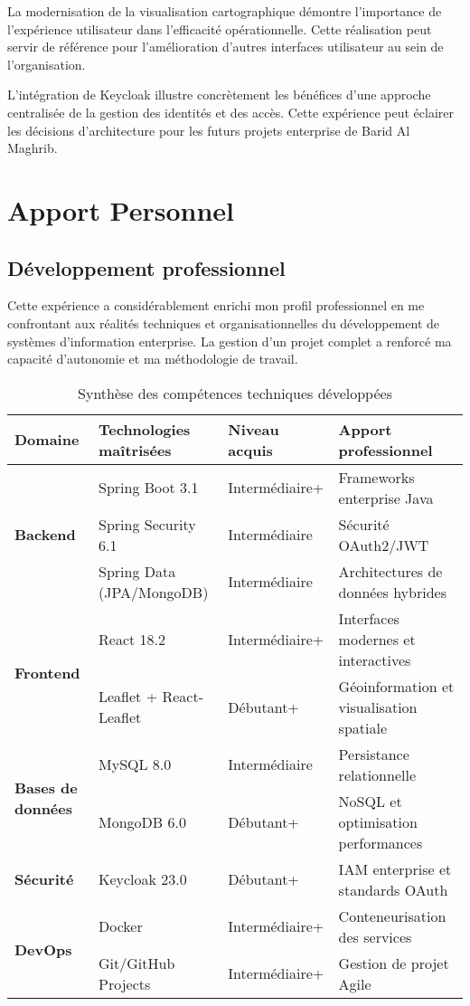 La modernisation de la visualisation cartographique démontre l'importance de l'expérience utilisateur dans l'efficacité opérationnelle. Cette réalisation peut servir de référence pour l'amélioration d'autres interfaces utilisateur au sein de l'organisation.

L'intégration de Keycloak illustre concrètement les bénéfices d'une approche centralisée de la gestion des identités et des accès. Cette expérience peut éclairer les décisions d'architecture pour les futurs projets enterprise de Barid Al Maghrib.

\section{Apport Personnel}

\subsection{Développement professionnel}

Cette expérience a considérablement enrichi mon profil professionnel en me confrontant aux réalités techniques et organisationnelles du développement de systèmes d'information enterprise. La gestion d'un projet complet a renforcé ma capacité d'autonomie et ma méthodologie de travail.

\begin{table}[H]
\centering
\caption{Synthèse des compétences techniques développées}
\label{tab:competences_developpees}
\begin{tabular}{|l|p{4cm}|p{3cm}|p{4cm}|}
\hline
\textbf{Domaine} & \textbf{Technologies maîtrisées} & \textbf{Niveau acquis} & \textbf{Apport professionnel} \\
\hline
\multirow{3}{*}{\textbf{Backend}} & Spring Boot 3.1 & Intermédiaire+ & Frameworks enterprise Java \\
\cline{2-4}
& Spring Security 6.1 & Intermédiaire & Sécurité OAuth2/JWT \\
\cline{2-4}
& Spring Data (JPA/MongoDB) & Intermédiaire & Architectures de données hybrides \\
\hline
\multirow{2}{*}{\textbf{Frontend}} & React 18.2 & Intermédiaire+ & Interfaces modernes et interactives \\
\cline{2-4}
& Leaflet + React-Leaflet & Débutant+ & Géoinformation et visualisation spatiale \\
\hline
\multirow{2}{*}{\textbf{Bases de données}} & MySQL 8.0 & Intermédiaire & Persistance relationnelle \\
\cline{2-4}
& MongoDB 6.0 & Débutant+ & NoSQL et optimisation performances \\
\hline
\textbf{Sécurité} & Keycloak 23.0 & Débutant+ & IAM enterprise et standards OAuth \\
\hline
\multirow{2}{*}{\textbf{DevOps}} & Docker & Intermédiaire+ & Conteneurisation des services \\
\cline{2-4}
& Git/GitHub Projects & Intermédiaire+ & Gestion de projet Agile \\
\hline
\end{tabular}
\end{table}


